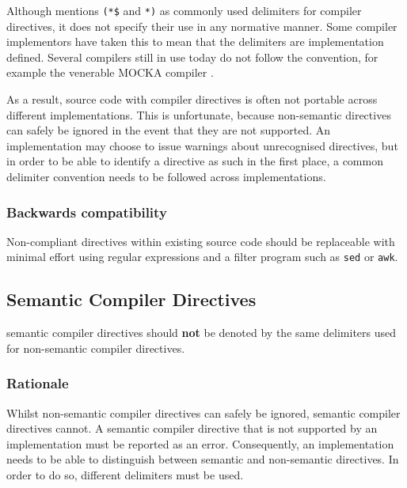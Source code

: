 \documentclass[10pt,a4paper]{article}
\begin{document}
Although \cite{Wirth88} mentions \verb|(*$| and \verb|*)| as commonly used
delimiters for \glspl{compiler directive}, it does not specify their use in any
normative manner. Some compiler implementors have taken this to mean that the
delimiters are implementation defined. Several compilers still in use today do
not follow the convention, for example the venerable MOCKA compiler \cite{MOCKA}.

As a result, source code with \glspl{compiler directive} is often not portable
across different implementations. This is unfortunate, because non-semantic
directives can safely be ignored in the event that they are not supported. An
implementation may choose to issue warnings about unrecognised directives, but
in order to be able to identify a directive as such in the first place, a
common delimiter convention needs to be followed across implementations.

\subsubsection{Backwards compatibility}

Non-compliant directives within existing source code should be replaceable with
minimal effort using regular expressions and a filter program such as
\verb|sed| or \verb|awk|. 


\subsection{Semantic Compiler Directives}

\Glspl{semantic compiler directive} should \textbf{not} be denoted by the same
delimiters used for \glspl{non-semantic compiler directive}.

\subsubsection{Rationale}

Whilst \glspl{non-semantic compiler directive} can safely be ignored,
\glspl{semantic compiler directive} cannot. A \gls{semantic compiler directive}
that is not supported by an implementation must be reported as an error.
Consequently, an implementation needs to be able to distinguish between
semantic and non-semantic directives. In order to do so, different delimiters
must be used.
\end{document}
